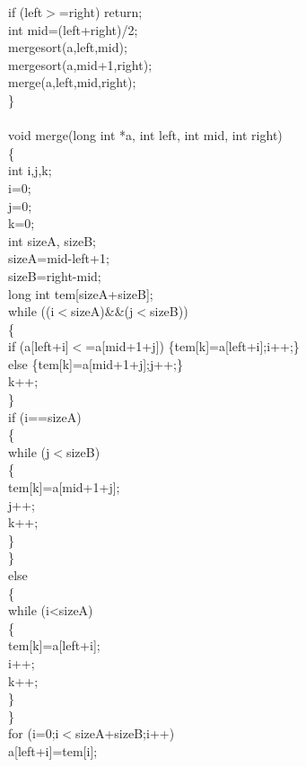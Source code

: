 \documentclass{article}
\begin{document}
    if (left$>$=right) return;\\
    int mid=(left+right)/2;\\
    mergesort(a,left,mid);\\
    mergesort(a,mid+1,right);\\
    merge(a,left,mid,right);\\
\}\\
\\
void merge(long int *a, int left, int mid, int right)\\
\{\\
    int i,j,k;\\
    i=0;\\
    j=0;\\
    k=0;\\
    int sizeA, sizeB;\\
    sizeA=mid-left+1;\\
    sizeB=right-mid;\\
    long int tem[sizeA+sizeB];\\
    while ((i$<$sizeA)\&\&(j$<$sizeB))\\
    \{\\
        if (a[left+i]$<$=a[mid+1+j]) \{tem[k]=a[left+i];i++;\}\\
        else \{tem[k]=a[mid+1+j];j++;\}\\
        k++;\\
    \}\\
    if (i==sizeA)\\
    \{\\
        while (j$<$sizeB)\\
        \{\\
            tem[k]=a[mid+1+j];\\
            j++;\\
            k++;\\
        \}\\
    \}\\
    else\\
    \{\\
        while (i<sizeA)\\
        \{\\
            tem[k]=a[left+i];\\
            i++;\\
            k++;\\
        \}\\
    \}\\
    for (i=0;i$<$sizeA+sizeB;i++)\\
        a[left+i]=tem[i];\\
\end{document}
